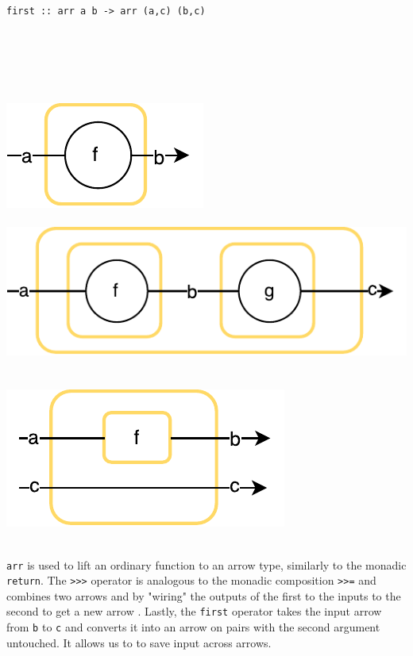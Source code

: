 \begin{minipage}{\textwidth}
\begin{minipage}{0.5\textwidth}
\begin{lstlisting}[frame=htrbl]
first :: arr a b -> arr (a,c) (b,c)
\end{lstlisting}
\end{minipage}
~~~~
\begin{minipage}{0.25\textwidth}
	~\\~\\~\\
	\includegraphics[scale=0.6]{images/arr}~\\~\\
	\includegraphics[scale=0.6]{images/compose}~\\~\\
	\includegraphics[scale=0.6]{images/first}~\\~\\
\end{minipage}
\end{minipage}
\lstinline{arr} is used to lift an ordinary function to an arrow type, similarly to the monadic \lstinline{return}. The \lstinline{>>>} operator is analogous to the monadic composition  \lstinline{>>=} and combines two arrows  and  by "wiring" the outputs of the first to the inputs to the second to get a new arrow . Lastly, the \lstinline{first} operator  takes the input arrow from \lstinline{b} to \lstinline{c} and converts it into an arrow on pairs with the second argument untouched. It allows us to to save input across arrows.
